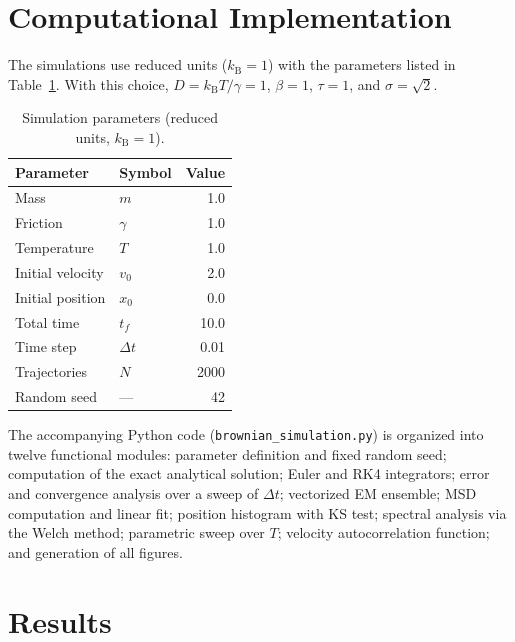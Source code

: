 \documentclass[aps,prl,twocolumn,showpacs,superscriptaddress,longbibliography]{revtex4-2}
\newcommand{\kB}{k_{\mathrm{B}}}
\newcommand{\dt}{\Delta t}
\begin{document}
\section{Computational Implementation}
\label{sec:comp}

The simulations use reduced units ($\kB=1$) with the parameters listed
in Table~\ref{tab:param}.  With this choice, $D=\kB T/\gamma=1$,
$\beta=1$, $\tau=1$, and $\sigma=\sqrt{2}$.

\begin{table}[h]
	\centering
	\caption{Simulation parameters (reduced units, $\kB=1$).}
	\label{tab:param}
	\begin{ruledtabular}
		\begin{tabular}{llr}
			Parameter          & Symbol      & Value \\
			\hline
			Mass               & $m$         & 1.0   \\
			Friction           & $\gamma$    & 1.0   \\
			Temperature        & $T$         & 1.0   \\
			Initial velocity   & $v_0$       & 2.0   \\
			Initial position   & $x_0$       & 0.0   \\
			Total time         & $t_f$       & 10.0  \\
			Time step          & $\dt$       & 0.01  \\
			Trajectories       & $N$         & 2000  \\
			Random seed        & —           & 42    \\
		\end{tabular}
	\end{ruledtabular}
\end{table}

The accompanying Python code (\texttt{brownian\_simulation.py}) is
organized into twelve functional modules: parameter definition and
fixed random seed; computation of the exact analytical solution;
Euler and RK4 integrators; error and convergence analysis over a sweep
of $\dt$; vectorized EM ensemble; MSD computation and linear fit;
position histogram with KS test; spectral analysis via the Welch
method; parametric sweep over $T$; velocity autocorrelation function;
and generation of all figures.

\section{Results}
\label{sec:resultados}
\end{document}
